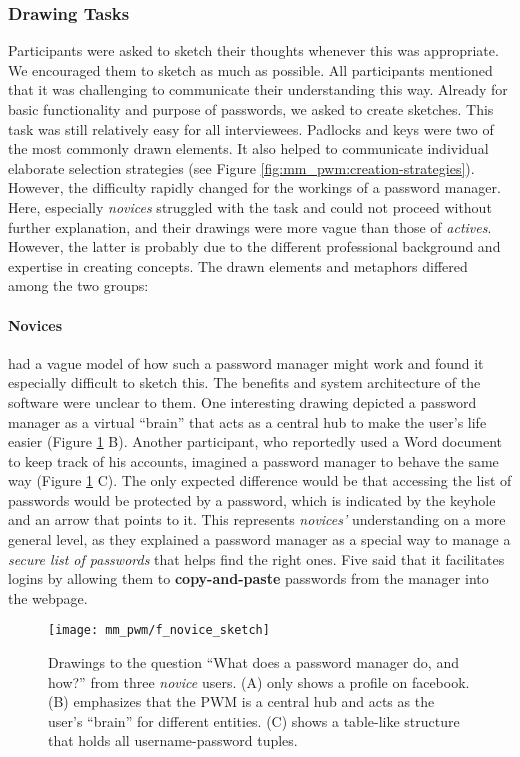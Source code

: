 \subsubsection{Drawing Tasks}
Participants were asked to sketch their thoughts whenever this was appropriate. We encouraged them to sketch as much as possible. All participants mentioned that it was challenging to communicate their understanding this way. Already for basic functionality and purpose of passwords, we asked to create sketches. This task was still relatively easy for all interviewees. Padlocks and keys were two of the most commonly drawn elements. It also helped to communicate individual elaborate selection strategies (see Figure \ref{fig:mm_pwm:creation-strategies}). However, the difficulty rapidly changed for the workings of a password manager.
Here, especially \textit{novices} struggled with the task and could not proceed without further explanation, and their drawings were more vague than those of \textit{actives}. However, the latter is probably due to the different professional background and expertise in creating concepts. The drawn elements and metaphors differed among the two groups: 
\paragraph{Novices} had a vague model of how such a password manager might work and found it especially difficult to sketch this. The benefits and system architecture of the software were unclear to them. One interesting drawing depicted a password manager as a virtual ``brain'' that acts as a central hub to make the user's life easier (Figure \ref{fig:mm_pwm:f_novice_sketch} B). Another participant, who reportedly used a Word document to keep track of his accounts, imagined a password manager to behave the same way (Figure \ref{fig:mm_pwm:f_novice_sketch} C). The only expected difference would be that accessing the list of passwords would be protected by a password, which is indicated by the keyhole and an arrow that points to it. This represents \textit{novices'} understanding on a more general level, as they explained a password manager as a special way to manage a \textit{secure list of passwords} that helps find the right ones. Five said that it facilitates logins by allowing them to \textbf{copy-and-paste} passwords from the manager into the webpage. 
\begin{figure}
	\centering
	\texttt{[image: mm\_pwm/f\_novice\_sketch]}
	\caption{\label{fig:mm_pwm:f_novice_sketch}	Drawings to the question ``What does a password manager do, and how?'' from three \textit{novice} users. (A) only shows a profile on facebook. (B) emphasizes that the PWM is a central hub and acts as the user's ``brain'' for different entities. (C) shows a table-like structure that holds all username-password tuples.}
\end{figure}


